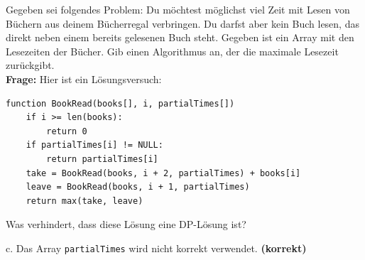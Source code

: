\begin{contentbox}
Gegeben sei folgendes Problem: Du möchtest möglichst viel Zeit mit Lesen von Büchern aus deinem Bücherregal verbringen. Du darfst aber kein Buch lesen, das direkt neben einem bereits gelesenen Buch steht. Gegeben ist ein Array mit den Lesezeiten der Bücher. Gib einen Algorithmus an, der die maximale Lesezeit zurückgibt.\\

\textbf{Frage:} Hier ist ein Lösungsversuch:
\end{contentbox}
\begin{codebox}
\begin{lstlisting}[style=CodeExpert]
function BookRead(books[], i, partialTimes[])
    if i >= len(books):
        return 0
    if partialTimes[i] != NULL:
        return partialTimes[i]
    take = BookRead(books, i + 2, partialTimes) + books[i]
    leave = BookRead(books, i + 1, partialTimes)
    return max(take, leave)
\end{lstlisting}
\end{codebox}
\begin{contentbox}
Was verhindert, dass diese Lösung eine DP-Lösung ist?
\begin{factlist}
    \item c. Das Array \texttt{partialTimes} wird nicht korrekt verwendet. \textbf{(korrekt)}
\end{factlist}
\end{contentbox}

